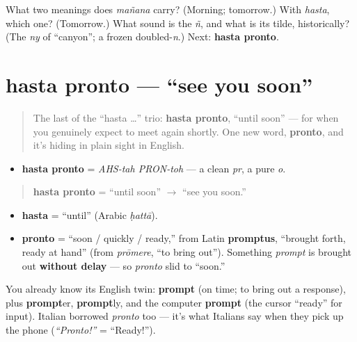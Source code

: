 \begin{tcolorbox}[breakable,colback=teal!4,colframe=teal!35!black,title={Before you move on}]
What two meanings does \emph{mañana} carry? (Morning; tomorrow.) With \emph{hasta}, which one? (Tomorrow.) What sound is the \emph{ñ}, and what is its tilde, historically? (The \emph{ny} of \textquotedblleft{}canyon\textquotedblright{}; a frozen doubled-\emph{n}.) Next: \textbf{hasta pronto}.
\end{tcolorbox}
\section[hasta pronto]{hasta pronto — \textquotedblleft{}see you soon\textquotedblright{}}

\label{lesson:ES-C05-hasta-pronto}



\begin{quote}
The last of the \textquotedblleft{}hasta …\textquotedblright{} trio: \textbf{hasta pronto}, \textquotedblleft{}until soon\textquotedblright{} — for when you genuinely expect to meet again shortly. One new word, \textbf{pronto}, and it's hiding in plain sight in English.
\end{quote}

\begin{sounds}
\begin{itemize}
\raggedright
  \item \textbf{hasta pronto} = \emph{AHS-tah PRON-toh} — a clean \emph{pr}, a pure \emph{o}.
\end{itemize}
\end{sounds}

\begin{cousinweb}
\begin{quote}
\textbf{hasta pronto} = \textquotedblleft{}until soon\textquotedblright{} $\to$ \textquotedblleft{}see you soon.\textquotedblright{}
\end{quote}

\begin{itemize}
\raggedright
  \item \textbf{hasta} = \textquotedblleft{}until\textquotedblright{} (Arabic \emph{ḥattā}).
  \item \textbf{pronto} = \textquotedblleft{}soon / quickly / ready,\textquotedblright{} from Latin \textbf{promptus}, \textquotedblleft{}brought forth, ready at hand\textquotedblright{} (from \emph{prōmere}, \textquotedblleft{}to bring out\textquotedblright{}). Something \emph{prompt} is brought out \textbf{without delay} — so \emph{pronto} slid to \textquotedblleft{}soon.\textquotedblright{}
\end{itemize}

You already know its English twin: \textbf{prompt} (on time; to bring out a response), plus \textbf{prompt}er, \textbf{prompt}ly, and the computer \textbf{prompt} (the cursor \textquotedblleft{}ready\textquotedblright{} for input). Italian borrowed \emph{pronto} too — it's what Italians say when they pick up the phone (\emph{\textquotedblleft{}Pronto!\textquotedblright{}} = \textquotedblleft{}Ready!\textquotedblright{}).
\end{cousinweb}

